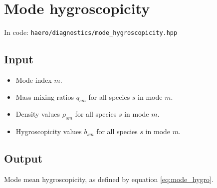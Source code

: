 \section{Mode hygroscopicity}

In code: \texttt{haero/diagnostics/mode\_hygroscopicity.hpp}

\subsection{Input}
  \begin{itemize}
    \item Mode index $m$.
    \item Mass mixing ratios $q_{sm}$ for all species $s$ in mode $m$.
    \item Density values $\rho_{sm}$ for all species $s$ in mode $m$.
    \item Hygroscopicity values $b_{sm}$ for all species $s$ in mode $m$.
  \end{itemize}

\subsection{Output}

  Mode mean hygroscopicity, as defined by equation \eqref{eq:mode_hygro}.